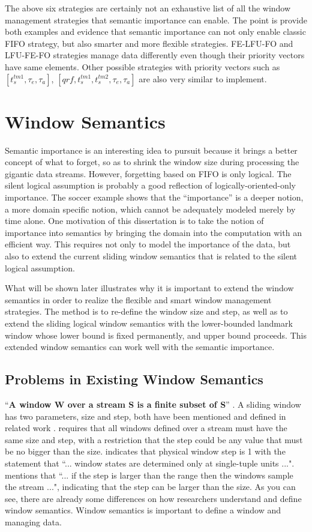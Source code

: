 The above six strategies are certainly not an exhaustive list of all the window management strategies that semantic importance can enable. 
The point is provide both examples and evidence that semantic importance can not only enable classic FIFO strategy, but also smarter and more flexible strategies. 
FE-LFU-FO and LFU-FE-FO strategies manage data differently even though their priority vectors have same elements. 
Other possible strategies with priority vectors such as $[t^{tm1}_{s}, \tau_{e}, \tau_{a}]$, $[qrf, t^{tm1}_{s}, t^{tm2}_{s}, \tau_{e}, \tau_{a}]$ are also very similar to implement.
%
\section{Window Semantics}
Semantic importance is an interesting idea to pursuit because it brings a better concept of what to forget, so as to shrink the window size during processing the gigantic data streams.
However, forgetting based on FIFO is only logical.
The silent logical assumption is probably a good reflection of logically-oriented-only importance.
The soccer example shows that the ``importance'' is a deeper notion, a more domain specific notion, which cannot be adequately modeled merely by time alone. 
One motivation of this dissertation is to take the notion of importance into semantics by bringing the domain into the computation with an efficient way. 
This requires not only to model the importance of the data, but also to extend the current sliding window semantics that is related to the silent logical assumption. 

What will be shown later illustrates why it is important to extend the window semantics in order to realize the flexible and smart window management strategies.
The method is to re-define the window size and step, as well as to extend the sliding logical window semantics with the lower-bounded landmark window whose lower bound is fixed permanently, and upper bound proceeds. 
This extended window semantics can work well with the semantic importance. 
%
\subsection{Problems in Existing Window Semantics}
``\textbf{A window W over a stream S is a finite subset of S}'' \cite{dindar2013modeling}.
A sliding window has two parameters, size and step, both have been mentioned and defined in related work \cite{beck2015lars} \cite{dindar2013modeling} \cite{prud2008sparql} \cite{botan2010secret} \cite{arasu2006cql}.
\cite{dindar2013modeling} requires that all windows defined over a stream must have the same size and step, with a restriction that the step could be any value that must be no bigger than the size.
\cite{patroumpas2006window} indicates that physical window step is 1 with the statement that ``... window states are determined only at single-tuple units ...". 
\cite{calbimonte2010enabling} mentions that ``... if the step is larger than the range then the windows sample the stream ...", indicating that the step can be larger than the size. 
As you can see, there are already some differences on how researchers understand and define window semantics. 
Window semantics is important to define a window and managing data.

